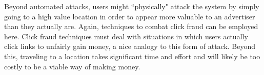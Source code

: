 Beyond automated attacks, users might ``physically" attack the system by simply going to a high value location in order to appear more valuable to an advertiser than they actually are.
Again, techniques to combat click fraud can be employed here.
Click fraud techniques must deal with situations in which users actually click links to unfairly gain money, a nice analogy to this form of attack.
Beyond this, traveling to a location takes significant time and effort and will likely be too costly to be a viable way of making money.


